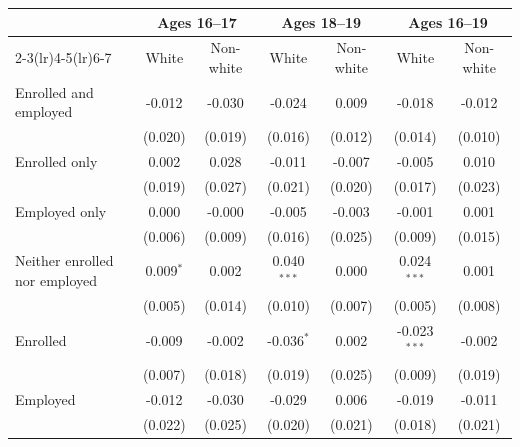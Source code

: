 \begin{tabular}{lcccccc}
\toprule
 & \multicolumn{2}{c}{Ages 16--17} & \multicolumn{2}{c}{Ages 18--19} & \multicolumn{2}{c}{Ages 16--19} \\
\cmidrule(lr){2-3}\cmidrule(lr){4-5}\cmidrule(lr){6-7}
 & White & Non-white & White & Non-white & White & Non-white \\
\midrule
Enrolled and employed & -0.012 & -0.030 & -0.024 & 0.009 & -0.018 & -0.012 \\
 & (0.020) & (0.019) & (0.016) & (0.012) & (0.014) & (0.010) \\
Enrolled only & 0.002 & 0.028 & -0.011 & -0.007 & -0.005 & 0.010 \\
 & (0.019) & (0.027) & (0.021) & (0.020) & (0.017) & (0.023) \\
Employed only & 0.000 & -0.000 & -0.005 & -0.003 & -0.001 & 0.001 \\
 & (0.006) & (0.009) & (0.016) & (0.025) & (0.009) & (0.015) \\
Neither enrolled nor employed & 0.009$^{*}$ & 0.002 & 0.040$^{***}$ & 0.000 & 0.024$^{***}$ & 0.001 \\
 & (0.005) & (0.014) & (0.010) & (0.007) & (0.005) & (0.008) \\
Enrolled & -0.009 & -0.002 & -0.036$^{*}$ & 0.002 & -0.023$^{***}$ & -0.002 \\
 & (0.007) & (0.018) & (0.019) & (0.025) & (0.009) & (0.019) \\
Employed & -0.012 & -0.030 & -0.029 & 0.006 & -0.019 & -0.011 \\
 & (0.022) & (0.025) & (0.020) & (0.021) & (0.018) & (0.021) \\
\bottomrule
\end{tabular}
